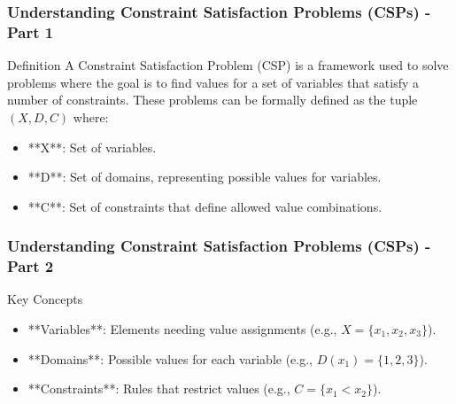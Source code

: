 \documentclass[aspectratio=169]{beamer}
\begin{document}
\begin{frame}[fragile]
    \frametitle{Understanding Constraint Satisfaction Problems (CSPs) - Part 1}
    \begin{block}{Definition}
        A Constraint Satisfaction Problem (CSP) is a framework used to solve problems where the goal is to find values for a set of variables that satisfy a number of constraints. These problems can be formally defined as the tuple \((X, D, C)\) where:
    \end{block}
    \begin{itemize}
        \item **X**: Set of variables.
        \item **D**: Set of domains, representing possible values for variables.
        \item **C**: Set of constraints that define allowed value combinations.
    \end{itemize}
\end{frame}

\begin{frame}[fragile]
    \frametitle{Understanding Constraint Satisfaction Problems (CSPs) - Part 2}
    \begin{block}{Key Concepts}
        \begin{itemize}
            \item **Variables**: Elements needing value assignments (e.g., \( X = \{x_1, x_2, x_3\} \)).
            \item **Domains**: Possible values for each variable (e.g., \( D(x_1) = \{1, 2, 3\} \)).
            \item **Constraints**: Rules that restrict values (e.g., \( C = \{x_1 < x_2\} \)).
        \end{itemize}
    \end{block}
\end{frame}
\end{document}
